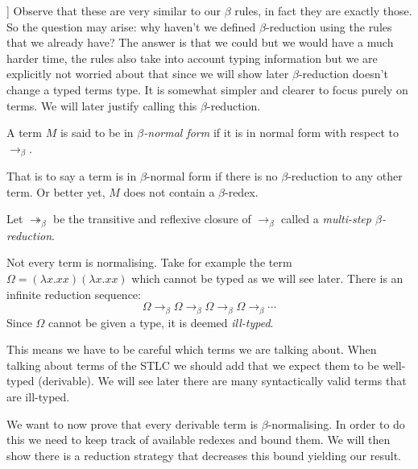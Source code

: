 \begin{remark}[[Clear up wording]]
    Observe that these are very similar to our $\beta$ rules, in fact they are exactly those. So the question may arise: why haven't we defined $\beta$-reduction using the rules that we already have? The answer is that we could but we would have a much harder time, the rules also take into account typing information but we are explicitly not worried about that since we will show later $\beta$-reduction doesn't change a typed terms type. It is somewhat simpler and clearer to focus purely on terms. We will later justify calling this $\beta$-reduction.
\end{remark}

\begin{defin}
    A term $M$ is said to be in \emph{$\beta$-normal form} if it is in normal form with respect to $\to_\beta$.
\end{defin}

\begin{remark}
    That is to say a term is in $\beta$-normal form if there is no $\beta$-reduction to any other term. Or better yet, $M$ does not contain a $\beta$-redex.
\end{remark}

\begin{defin}
    Let $\twoheadrightarrow_{\beta}$ be the transitive and reflexive closure of $\to_{\beta}$ called a \emph{multi-step $\beta$-reduction}.
\end{defin}

\begin{remark}\label{beta_non_normalising_remark}
    Not every term is normalising. Take for example the term $\Omega=(\lambda x . x x)(\lambda x . x x)$ which cannot be typed as we will see later. There is an infinite reduction sequence:
    $$
        \Omega \to_{\beta} \Omega \to_{\beta} \Omega \to_{\beta} \Omega \to_{\beta} \cdots
    $$
    Since $\Omega$ cannot be given a type, it is deemed \emph{ill-typed}.
\end{remark}

This means we have to be careful which terms we are talking about. When talking about terms of the STLC we should add that we expect them to be well-typed (derivable). We will see later there are many syntactically valid terms that are ill-typed.

We want to now prove that every derivable term is $\beta$-normalising. In order to do this we need to keep track of available redexes and bound them. We will then show there is a reduction strategy that decreases this bound yielding our result.

